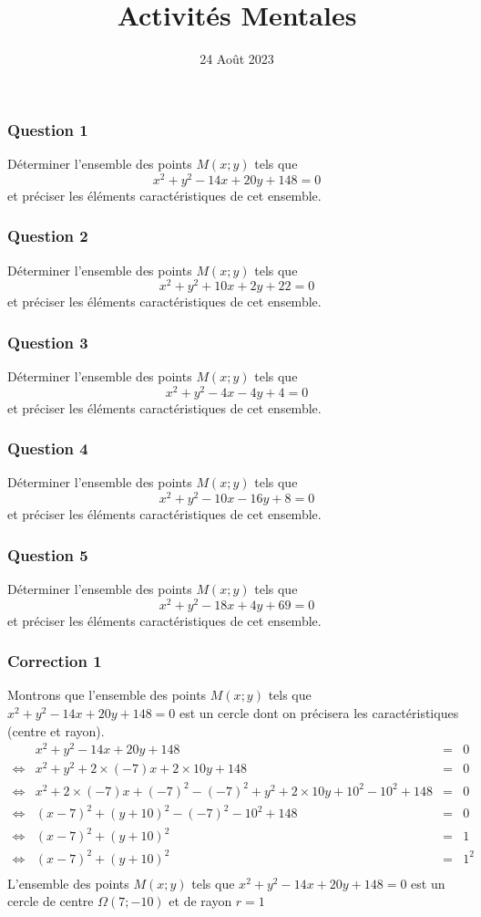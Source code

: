 \documentclass[15pt, mathserif]{beamer}
\title{Activités Mentales}
\date{24 Août 2023}
\begin{document}
\begin{frame}
    \titlepage
\end{frame}

\begin{frame} 
	\frametitle{Question 1}
Déterminer l'ensemble des points $M(x;y)$ tels que $$x^2+y^2-14x+20y+148=0$$ et préciser les éléments caractéristiques de cet ensemble.\end{frame}


\begin{frame} 
	\frametitle{Question 2}
Déterminer l'ensemble des points $M(x;y)$ tels que $$x^2+y^2+10x+2y+22=0$$ et préciser les éléments caractéristiques de cet ensemble.\end{frame}


\begin{frame} 
	\frametitle{Question 3}
Déterminer l'ensemble des points $M(x;y)$ tels que $$x^2+y^2-4x-4y+4=0$$ et préciser les éléments caractéristiques de cet ensemble.\end{frame}


\begin{frame} 
	\frametitle{Question 4}
Déterminer l'ensemble des points $M(x;y)$ tels que $$x^2+y^2-10x-16y+8=0$$ et préciser les éléments caractéristiques de cet ensemble.\end{frame}


\begin{frame} 
	\frametitle{Question 5}
Déterminer l'ensemble des points $M(x;y)$ tels que $$x^2+y^2-18x+4y+69=0$$ et préciser les éléments caractéristiques de cet ensemble.\end{frame}


\begin{frame}
\vspace{-10mm}
	\frametitle{Correction 1}
Montrons que l'ensemble des points $M(x; y)$ tels que $x^2+y^2-14x+20y+148=0$ est un cercle dont on précisera les caractéristiques (centre et rayon). 
 $$\begin{array}{crcl} 
 & x^2+y^2-14x+20y+148& = & 0 \\ 
 \Leftrightarrow & x^2+y^2+2 \times\left(-7\right)x+2 \times 10y+148 & = & 0 \\ 
 \Leftrightarrow & x^2+2 \times\left(-7\right)x+ \left(-7\right)^2-\left(-7\right)^2+y^2+2 \times 10y + 10^2-10^2+148 & = & 0 \\ 
 \Leftrightarrow & (x-7)^2+(y+10)^2-\left(-7\right)^2-10^2+148 & = & 0 \\ 
 \Leftrightarrow & (x-7)^2+(y+10)^2 & = & 1 \\ 
 \Leftrightarrow & (x-7)^2+(y+10)^2 & = & 1^2 \\ 
 \end{array}$$ 
 L'ensemble des points $M(x; y)$ tels que $x^2+y^2-14x+20y+148=0$ est un cercle de centre $\Omega(7;-10)$ et de rayon $r =1$\end{frame}
\end{document}

